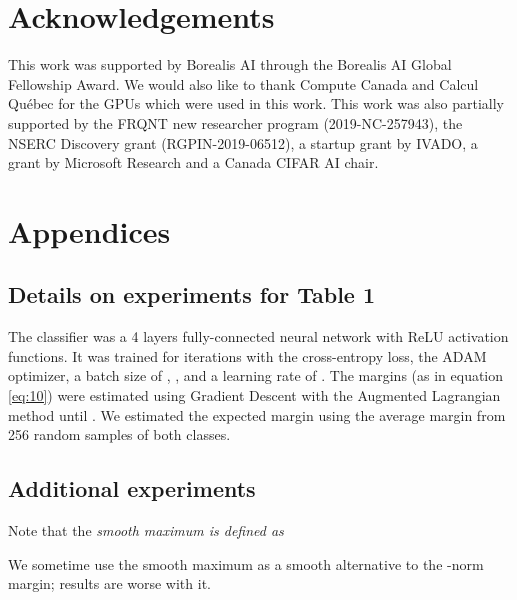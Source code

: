 \documentclass{article}
\begin{document}
\section{Acknowledgements}
This work was supported by Borealis AI through the Borealis AI Global Fellowship Award. We would also like to thank Compute Canada and Calcul Québec for the GPUs which were used in this work.
This work was also partially supported by the FRQNT new researcher program (2019-NC-257943), the NSERC Discovery grant (RGPIN-2019-06512), a startup grant by IVADO, a grant by Microsoft Research and a Canada CIFAR AI chair.




\clearpage

\appendix
\section*{Appendices}
\renewcommand{\thesubsection}{\Alph{subsection}}

\subsection{Details on experiments for Table 1}
\label{sec:111}

The classifier was a 4 layers fully-connected neural network with ReLU activation functions. It was trained for  iterations with the cross-entropy loss, the ADAM optimizer, a batch size of , , and a learning rate of . The margins (as in equation \ref{eq:10}) were estimated using Gradient Descent with the Augmented Lagrangian method \citep{hestenes1969multiplier} until . We estimated the expected margin using the average margin from 256 random samples of both classes.

\subsection{Additional experiments}

Note that the \em smooth maximum \em is defined as

We sometime use the smooth maximum as a smooth alternative to the -norm margin; results are worse with it.
\end{document}

